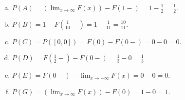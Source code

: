 \documentclass{article}
\begin{document}
\begin{enumerate}[a)]
\item $P(A) = (\lim_{x\rightarrow \infty} F(x)) - F(1-) = 1 - \frac{1}{2} = \frac{1}{2}$.

\item $P(B) = 1- F\left(\frac{1}{10}-\right) = 1 - \frac{1}{11} = \frac{10}{11}$.

\item $P(C) = P([0,0]) = F(0) - F(0-) = 0 - 0 = 0$.

\item $P(D) = F\left(\frac{1}{2}-\right) - F(0-) = \frac{1}{3} - 0 = \frac{1}{3}$ 

\item $P(E) = F(0-) - \lim_{x\rightarrow - \infty} F(x) = 0 - 0 = 0$.

\item $P(G) = (\lim_{x\rightarrow \infty} F(x)) - F(0) = 1-0 = 1$.
\end{enumerate}
\end{document}
